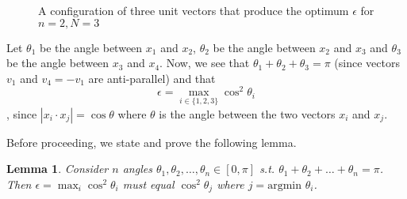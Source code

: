 \documentclass[11pt,letterpaper,twoside,english]{article}
\theoremstyle{theorem}
\newtheorem{lemma}[theorem]{Lemma}
\theoremstyle{remark}
\begin{document}
\begin{figure}[!h]
    \centering
    \caption{A configuration of three unit vectors that produce the optimum $\epsilon$ for $n=2, N=3$}
\end{figure}


Let $\theta_1$ be the angle between $x_1$ and $x_2$, $\theta_2$ be the angle between $x_2$ and $x_3$ and $\theta_3$ be the angle between $x_3$ and $x_4$. Now, we see that $\theta_1 + \theta_2 + \theta_3 = \pi$ (since vectors $v_1$ and $v_4 = -v_1$ are anti-parallel) and that $$\epsilon = \max_{i \in \{1,2,3\}} \cos ^2 \theta_i$$, since $|x_i \cdot x_j| = \cos \theta$ where $\theta$ is the angle between the two vectors $x_i$ and $x_j$.

Before proceeding, we state and prove the following lemma.
\begin{lemma}
Consider $n$ angles $\theta_1, \theta_2, \ldots, \theta_n \in [0, \pi]$ s.t. $\theta_1 + \theta_2 + \ldots + \theta_n = \pi$. Then $\epsilon = \max_i \cos^2 \theta_i$ must equal $\cos^2 \theta_j$ where $j = \text{argmin }\theta_i$.
\end{lemma}
\end{document}
